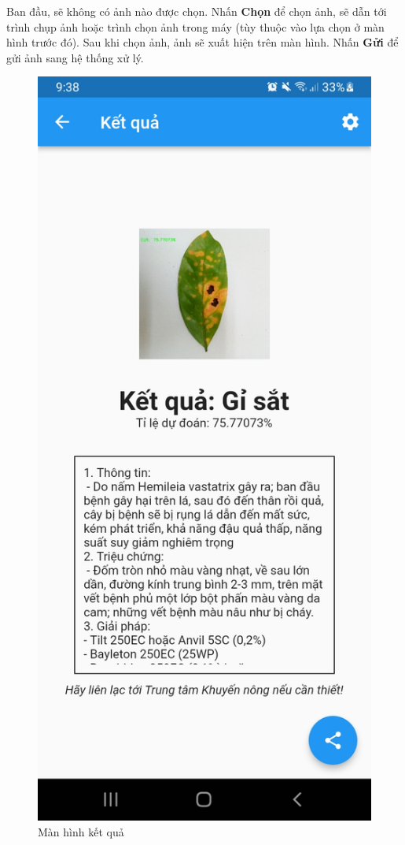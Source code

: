 \documentclass[a4paper,14pt]{extarticle}
\begin{document}
	Ban đầu, sẽ không có ảnh nào được chọn. Nhấn \textbf{Chọn} để chọn ảnh, sẽ dẫn tới trình chụp ảnh hoặc trình chọn ảnh trong máy (tùy thuộc vào lựa chọn ở màn hình trước đó). Sau khi chọn ảnh, ảnh sẽ xuất hiện trên màn hình. Nhấn \textbf{Gửi} để gửi ảnh sang hệ thống xử lý.

	\begin{figure}[H]
		\centering
		\includegraphics[scale=0.1]{images/screenshot4.jpg}
		\caption{Màn hình kết quả}
	\end{figure}
\end{document}
